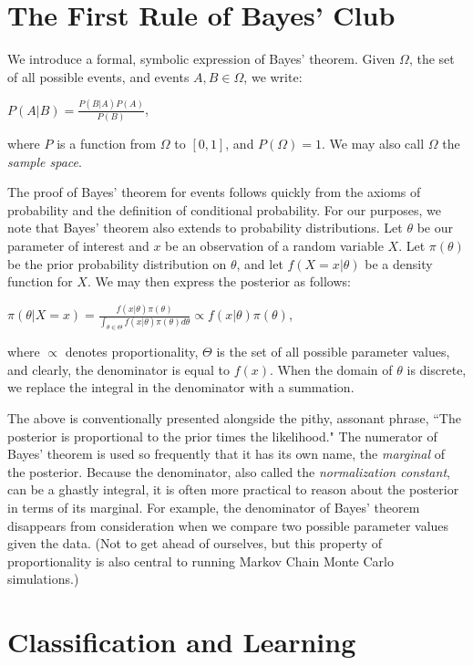 \documentclass[12pt,twoside]{reedthesis}
\begin{document}
\section{The First Rule of Bayes' Club}

We introduce a formal, symbolic expression of Bayes' theorem. Given $\Omega$, the set of all possible events, and events $A, B \in \Omega$, we write:

\begin{center}
	$P(A | B) = \displaystyle\frac{P(B | A)P(A)}{P(B)}$,
\end{center}
where $P$ is a function from $\Omega$ to $[0,1]$, and $P(\Omega) = 1$. We may also call $\Omega$ the {\em sample space}.

	The proof of Bayes' theorem for events follows quickly from the axioms of probability and the definition of conditional probability. For our purposes, we note that Bayes' theorem also extends to probability distributions. Let $\theta$ be our parameter of interest and $x$ be an observation of a random variable $X$. Let $\pi(\theta)$ be the prior probability distribution on $\theta$, and let $f(X = x | \theta)$ be a density function for $X$. We may then express the posterior as follows:
\begin{center}
	$\pi(\theta | X = x) = \displaystyle\frac{f(x | \theta)\pi(\theta)}{\int_{\theta \in \Theta}f(x |\theta)\pi(\theta)d\theta} \propto f({x} | \theta)\pi(\theta)$,
\end{center}
where $\propto$ denotes proportionality, $\Theta$ is the set of all possible parameter values, and clearly, the denominator is equal to $f(x)$. When the domain of $\theta$ is discrete, we replace the integral in the denominator with a summation.

The above is conventionally presented alongside the pithy, assonant phrase, ``The posterior is proportional to the prior times the likelihood." The numerator of Bayes' theorem is used so frequently that it has its own name, the {\em marginal} of the posterior. Because the denominator, also called the {\em normalization constant}, can be a ghastly integral, it is often more practical to reason about the posterior in terms of its marginal. For example, the denominator of Bayes' theorem disappears from consideration when we compare two possible parameter values given the data. (Not to get ahead of ourselves, but this property of proportionality is also central to running Markov Chain Monte Carlo simulations.)

\section{Classification and Learning}
\end{document}

